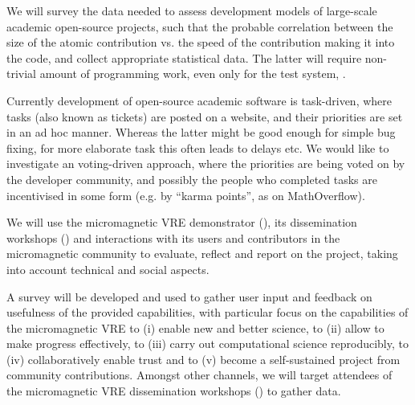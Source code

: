\begin{workpackage}[id=social-aspects,wphases=0-48,
  title=Social Aspects,
  lead=UO,
  UORM=27,USHRM=8, USORM=6]
\begin{tasklist}
\begin{task}[title=Survey and collection of needed data,id=datacollection]
We will survey the data needed to assess development models of
large-scale academic open-source projects, such that the probable
correlation between the size of the atomic contribution vs. the speed
of the contribution making it into the code, and collect appropriate
statistical data. The latter will require non-trivial amount of
programming work, even only for the test system, \Sage.
\end{task}

\begin{task}[title=Collective decision making in development,id=decisionmaking]
Currently development of open-source academic software is task-driven,
where tasks (also known as tickets) are posted on a website, and their
priorities are set in an ad hoc manner.  Whereas the latter might be
good enough for simple bug fixing, for more elaborate task this often
leads to delays etc.  We would like to investigate an voting-driven
approach, where the priorities are being voted on by the developer
community, and possibly the people who completed tasks are
incentivised in some form (e.g. by ``karma points'', as on
MathOverflow).
\end{task}

\begin{task}[title=Evaluation of Micromagnetic VRE,lead=USO,PM=6,id=oommf-nb-evaluation]
  We will use the micromagnetic VRE demonstrator
  (), its dissemination
  workshops \linebreak()
  and interactions with its users and contributors in the
  micromagnetic community to evaluate, reflect and report on the project,
  taking into account technical and social aspects.

  A survey will be developed and used to gather user input and
  feedback on usefulness of the provided capabilities, with particular
  focus on the capabilities of the micromagnetic VRE to (i) enable new
  and better science, to (ii) allow to make progress effectively, to
  (iii) carry out computational science reproducibly, to (iv)
  collaboratively enable trust and to (v) become a self-sustained
  project from community contributions. Amongst other channels, we
  will target attendees of the micromagnetic VRE dissemination
  workshops () to
  gather data.


\end{task}
\end{tasklist}
\end{workpackage}
